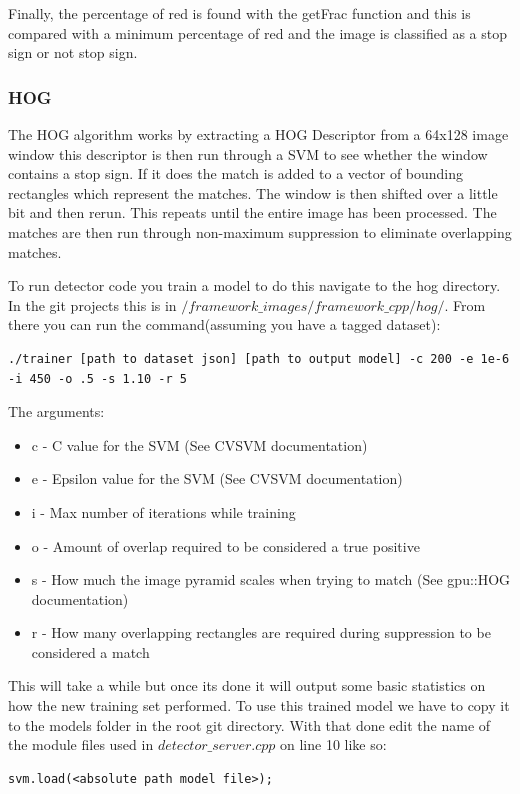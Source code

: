 \documentclass[letterpaper,10pt,titlepage]{article}
\begin{document}
Finally, the percentage of red is found with the getFrac function and this is
compared with a minimum percentage of red and the image is classified as a 
stop sign or not stop sign. 
\subsubsection*{HOG}
The HOG algorithm works by extracting a HOG Descriptor from a 64x128 image window
this descriptor is then run through a SVM to see whether the window contains a 
stop sign. If it does the match is added to a vector of bounding rectangles which
represent the matches. The window is then shifted over a little bit and then rerun.
This repeats until the entire image has been processed. The matches are then run 
through non-maximum suppression to eliminate overlapping matches.

To run detector code you train a model to do this navigate to the hog directory. In
the git projects this is in $/framework\_images/framework\_cpp/hog/$. From there you can
run the command(assuming you have a tagged dataset):
\begin{lstlisting}
./trainer [path to dataset json] [path to output model] -c 200 -e 1e-6 -i 450 -o .5 -s 1.10 -r 5
\end{lstlisting}
The arguments:
\begin{itemize}
    \item c - C value for the SVM (See CVSVM documentation)
    \item e - Epsilon value for the SVM (See CVSVM documentation)
    \item i - Max number of iterations while training
    \item o - Amount of overlap required to be considered a true positive
    \item s - How much the image pyramid scales when trying to match (See gpu::HOG documentation)
    \item r - How many overlapping rectangles are required during suppression to be considered a match
\end{itemize}

This will take a while but once its done it will output some basic statistics 
on how the new training set performed. To use this trained model we have to copy it
to the models folder in the root git directory. With that done edit the name of the
module files used in $detector\_server.cpp$ on line 10 like so:
\begin{lstlisting}
svm.load(<absolute path model file>); 
\end{lstlisting}
\end{document}
